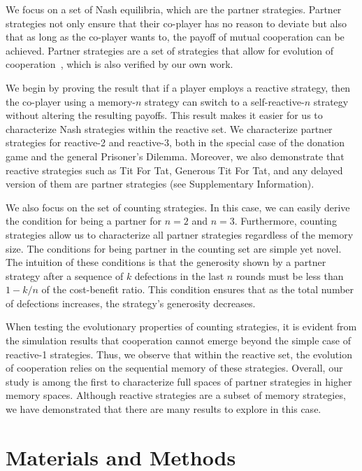 \documentclass{article}
\theoremstyle{definition}
\begin{document}
We focus on a set of Nash equilibria, which are the partner strategies. Partner
strategies not only ensure that their co-player has no reason to deviate but
also that as long as the co-player wants to, the payoff of mutual cooperation
can be achieved. Partner strategies are a set of strategies that
allow for evolution of cooperation~\cite{hilbe:Nature:2018},
which is also verified by our own work.

We begin by proving the result that if a player employs a reactive strategy,
then the co-player using a memory-$n$ strategy can switch to a self-reactive-$n$
strategy without altering the resulting payoffs. This result makes it easier for
us to characterize Nash strategies within the reactive set. We characterize
partner strategies for reactive-2 and reactive-3, both in the special case of
the donation game and the general Prisoner's Dilemma. Moreover, we also
demonstrate that reactive strategies such as Tit For Tat, Generous Tit For Tat,
and any delayed version of them are partner strategies (see Supplementary
Information).

We also focus on the set of counting strategies. In this case, we can easily
derive the condition for being a partner for $n=2$ and $n=3$. Furthermore,
counting strategies allow us to characterize all partner strategies regardless
of the memory size. The conditions for being partner in the counting set are
simple yet novel. The intuition of these conditions is that the generosity shown
by a partner strategy after a sequence of $k$ defections in the last $n$ rounds
must be less than $1 - k/n$ of the cost-benefit ratio. This condition ensures
that as the total number of defections increases, the strategy's generosity
decreases.

When testing the evolutionary properties of counting strategies, it is evident
from the simulation results that cooperation cannot emerge beyond the simple
case of reactive-1 strategies. Thus, we observe that within the reactive set,
the evolution of cooperation relies on the sequential memory of these strategies.
Overall, our study is among the first to characterize full spaces of partner
strategies in higher memory spaces. Although reactive strategies are a subset of
memory strategies, we have demonstrated that there are many results to explore
in this case.

\section{Materials and Methods}\label{section:materials_and_methods}
\end{document}
